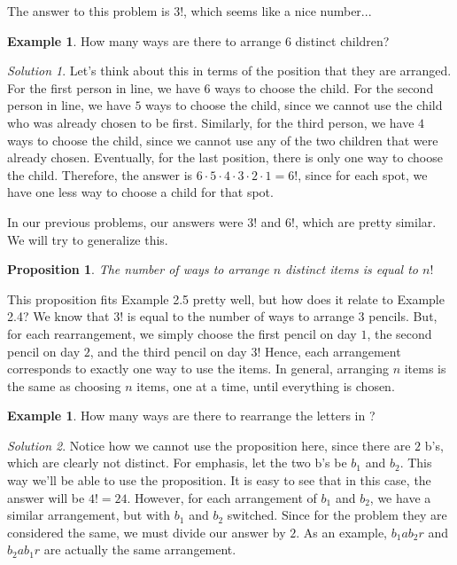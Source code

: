 \documentclass[l1pt]{article}
\theoremstyle{plain}
\newtheorem{prop}[thm]{Proposition}
\theoremstyle{definition}
\newtheorem{example}[thm]{Example}
\theoremstyle{remark}
\newtheorem*{solution}{Solution}
\begin{document}
The answer to this problem is $3!$, which seems like a nice number...

\begin{example}
How many ways are there to arrange $6$ distinct children?
\end{example}

\begin{solution}
Let's think about this in terms of the position that they are arranged. For the first person in line, we have $6$ ways to choose the child. For the second person in line, we have $5$ ways to choose the child, since we cannot use the child who was already chosen to be first. Similarly, for the third person, we have $4$ ways to choose the child, since we cannot use any of the two children that were already chosen. Eventually, for the last position, there is only one way to choose the child. Therefore, the answer is $6\cdot 5\cdot 4\cdot 3\cdot 2\cdot 1=6!$, since for each spot, we have one less way to choose a child for that spot.
\end{solution}

In our previous problems, our answers were $3!$ and $6!$, which are pretty similar. We will try to generalize this.



\begin{mdframed}
\begin{prop}
The number of ways to arrange $n$ distinct items is equal to $n!$
\end{prop}
\end{mdframed}

This proposition fits Example 2.5 pretty well, but how does it relate to Example 2.4? We know that $3!$ is equal to the number of ways to arrange $3$ pencils. But, for each rearrangement, we simply choose the first pencil on day $1$, the second pencil on day $2$, and the third pencil on day $3$! Hence, each arrangement corresponds to exactly one way to use the items. In general, arranging $n$ items is the same as choosing $n$ items, one at a time, until everything is chosen.




\begin{example}
How many ways are there to rearrange the letters in ?
\end{example}

\begin{solution}
Notice how we cannot use the proposition here, since there are $2$ b's, which are clearly not distinct. For emphasis, let the two b's be $b_1$ and $b_2$. This way we'll be able to use the proposition. It is easy to see that in this case, the answer will be $4!=24$. However, for each arrangement of $b_1$ and $b_2$, we have a similar arrangement, but with $b_1$ and $b_2$ switched. Since for the problem they are considered the same, we must divide our answer by $2$. As an example, $b_1 a b_2 r$ and $b_2 a b_1 r$ are actually the same arrangement.
\end{solution}
\end{document}
